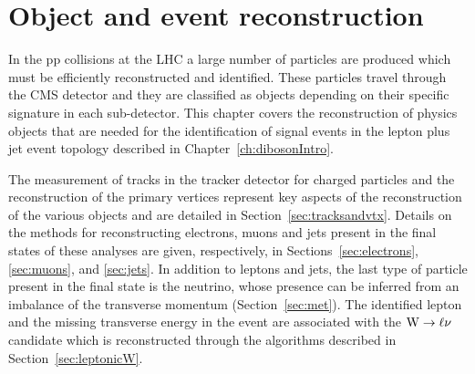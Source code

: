 \chapter{Object and event reconstruction}
\label{ch:EventReconstruction}

In the pp collisions at the LHC a large number of particles are produced which must be efficiently reconstructed and identified. These particles travel through the CMS detector and they are classified as objects depending on their specific signature in each sub-detector. This chapter covers the reconstruction of physics objects that are needed for the identification of signal events in the lepton plus jet event topology described in Chapter~\ref{ch:dibosonIntro}.

The measurement of tracks in the tracker detector for charged particles and the reconstruction of the primary vertices represent key aspects of the reconstruction of the various objects and are detailed in Section~\ref{sec:tracksandvtx}. Details on the methods for reconstructing electrons, muons and jets present in the final states of these analyses are given, respectively, in Sections~\ref{sec:electrons}, \ref{sec:muons}, and \ref{sec:jets}. %
In addition to leptons and jets, the last type of particle present in the final state is the neutrino, whose presence can be inferred from an imbalance of the transverse momentum (Section~\ref{sec:met}).
The identified lepton and the missing transverse energy in the event are associated with the $\mathrm{W}\to\ell\nu$ candidate which is reconstructed through the algorithms described in Section~\ref{sec:leptonicW}.

 
 
 
 
